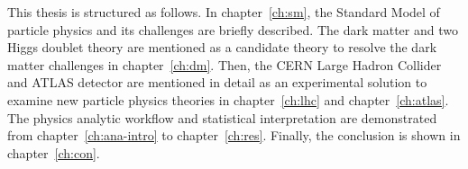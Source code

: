 \par This thesis is structured as follows. 
In chapter~\ref{ch:sm}, the Standard Model of particle physics and its challenges are briefly described. 
The dark matter and two Higgs doublet theory are mentioned as a candidate theory to resolve the dark matter challenges in chapter~\ref{ch:dm}. 
Then, the CERN Large Hadron Collider and ATLAS detector are mentioned in detail as an experimental solution to examine new particle physics theories in chapter~\ref{ch:lhc} and chapter~\ref{ch:atlas}. 
The physics analytic workflow and statistical interpretation are demonstrated from chapter~\ref{ch:ana-intro} to chapter~\ref{ch:res}. 
Finally, the conclusion is shown in chapter~\ref{ch:con}.
